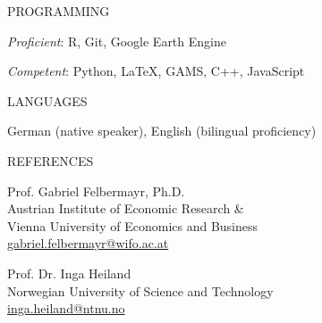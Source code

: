 \documentclass{article}
\begin{document}
\begin{minipage}[t]{0.12\textwidth}
    {\selectfont PROGRAMMING} \\
\end{minipage}
\hspace{5mm}
\begin{minipage}[t]{0.8\textwidth}
    \textit{Proficient}: R, Git, Google Earth Engine \par
    \textit{Competent}: Python, LaTeX, GAMS, C++, JavaScript
\end{minipage}
\medskip


\begin{minipage}[t]{0.12\textwidth}
    {\selectfont LANGUAGES} \\
\end{minipage}
\hspace{5mm}
\begin{minipage}[t]{0.8\textwidth}
    German (native speaker), English (bilingual proficiency)
\end{minipage}
\medskip


\begin{minipage}[t]{0.12\textwidth}
    {\selectfont REFERENCES} \\
\end{minipage}
\hspace{5mm}
\begin{minipage}[t]{0.4\textwidth}
    Prof. Gabriel Felbermayr, Ph.D. \\
    Austrian Institute of Economic Research \& \\
    Vienna University of Economics and Business \\
\href{mailto:gabriel.felbermayr@wifo.ac.at}{gabriel.felbermayr@wifo.ac.at}
\end{minipage}
\hspace{5mm}
\begin{minipage}[t]{0.4\textwidth}
    Prof. Dr. Inga Heiland \\
    Norwegian University of Science and Technology \\
\href{mailto:inga.heiland@ntnu.no}{inga.heiland@ntnu.no}
\end{minipage}
\bigskip
\bigskip

\end{document}
